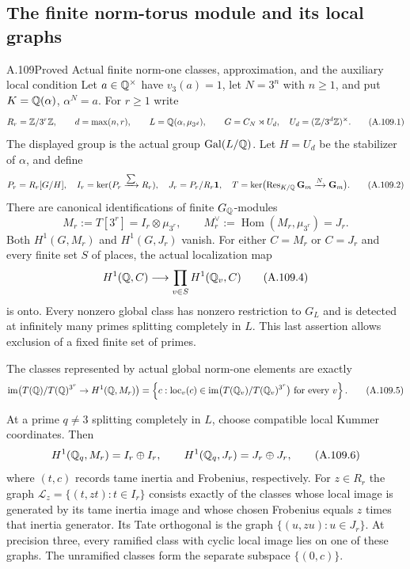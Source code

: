 \subsection{The finite norm-torus module and its local graphs}

\begin{statement}{A.109}{Proved}
{Actual finite norm-one classes, approximation, and the auxiliary local condition}
Let $a\in\mathbb Q^\times$ have $v_3(a)=1$, let $N=3^n$ with
$n\ge1$, and put $K=\mathbb Q(\alpha)$, $\alpha^N=a$.
For $r\ge1$ write
\[
 R_r=\mathbb Z/3^r\mathbb Z,\qquad d=\max(n,r),\qquad
 L=\mathbb Q(\alpha,\mu_{3^d}),\qquad
 G=C_N\rtimes U_d,\quad U_d=(\mathbb Z/3^d\mathbb Z)^\times.
 \tag{A.109.1}
\]
The displayed group is the actual group $\operatorname{Gal}(L/\mathbb Q)$.
Let $H=U_d$ be the stabilizer of $\alpha$, and define
\[
 P_r=R_r[G/H],\quad I_r=\ker(P_r\xrightarrow{\sum}R_r),
 \quad J_r=P_r/R_r\mathbf1,
 \quad T=\ker\bigl(\operatorname{Res}_{K/\mathbb Q}\mathbf G_m
                         \xrightarrow{N}\mathbf G_m\bigr).
 \tag{A.109.2}
\]
There are canonical identifications of finite $G_\mathbb Q$-modules
\[
 M_r:=T[3^r]=I_r\otimes\mu_{3^r},\qquad
 M_r^\vee:=\operatorname{Hom}(M_r,\mu_{3^r})=J_r.
 \tag{A.109.3}
\]
Both $H^1(G,M_r)$ and $H^1(G,J_r)$ vanish.
For either $C=M_r$ or $C=J_r$ and every finite set $S$ of places,
the actual localization map
\[
 H^1(\mathbb Q,C)\longrightarrow\prod_{v\in S}H^1(\mathbb Q_v,C)
 \tag{A.109.4}
\]
is onto.  Every nonzero global class has nonzero restriction to $G_L$
and is detected at infinitely many primes splitting completely in $L$.
This last assertion allows exclusion of a fixed finite set of primes.

The classes represented by actual global norm-one elements are exactly
\[
 \operatorname{im}\bigl(T(\mathbb Q)/T(\mathbb Q)^{3^r}\to H^1(\mathbb Q,M_r)\bigr)
 =\left\{c:\operatorname{loc}_v(c)\in
       \operatorname{im}\bigl(T(\mathbb Q_v)/T(\mathbb Q_v)^{3^r}\bigr)
          \text{ for every }v\right\}.
 \tag{A.109.5}
\]

At a prime $q\ne3$ splitting completely in $L$, choose compatible
local Kummer coordinates.  Then
\[
 H^1(\mathbb Q_q,M_r)=I_r\oplus I_r,\qquad
 H^1(\mathbb Q_q,J_r)=J_r\oplus J_r,
 \tag{A.109.6}
\]
where $(t,c)$ records tame inertia and Frobenius, respectively.
For $z\in R_r$ the graph
$\mathcal L_z=\{(t,zt):t\in I_r\}$ consists exactly of the
classes whose local image is generated by its tame inertia image
and whose chosen Frobenius equals $z$ times that inertia generator.
Its Tate orthogonal is the graph $\{(u,zu):u\in J_r\}$.
At precision three, every ramified class with cyclic local image lies
on one of these graphs.  The unramified classes form the separate
subspace $\{(0,c)\}$.


\end{statement}
